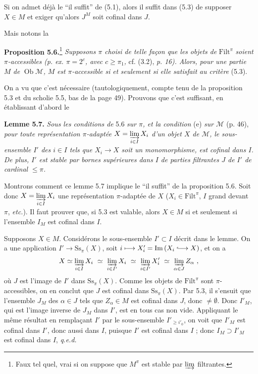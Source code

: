 \documentclass[11pt]{article}
\newcommand{\printedpage}[1]{\marginpar{\footnotesize p.~#1}}
\newcommand{\msp}[1]{\marginpar{\footnotesize [#1]}}
\newcommand{\cM}{\mathcal{M}}
\newcommand{\Filt}{\mathrm{Filt}}
\newcommand{\Ob}{\operatorname{Ob}}
\newcommand{\Ss}{\mathrm{Ss}}
\newcommand{\Img}{\mathrm{Im}\,}
\newcommand{\hookto}{\lhook\joinrel\longrightarrow}
\begin{document}
Si on admet déjà le ``il suffit'' de (5.1), alors il suffit dans (5.3) de supposer $X \in M$ et exiger qu'alors $J^{M}$ soit cofinal dans $J$.

Mais notons la
\msp{page 52}

\textbf{Proposition 5.6.}\footnote[21]{Faux tel quel, vrai si on suppose que $M^{\pi}$ est stable par $\varinjlim$ filtrantes.} \textit{Supposons $\pi$ choisi de telle façon que les objets de} $\Filt^{\pi}$ \textit{soient $\pi$-accessibles (p. ex. $\pi = 2^{c}$, avec $c \geq \pi_1$,} cf. (3.2), \textit{p. 16). Alors, pour une partie $M$ de} $\Ob\cM$\textit{, $M$ est $\pi$-accessible si et seulement si elle satisfait au critère} (5.3).

On a vu que c'est nécessaire (tautologiquement, compte tenu de la proposition 5.3 et du scholie 5.5, bas de la page 49). Prouvons que c'est suffisant, en établissant d'abord le

\textbf{Lemme 5.7.} \textit{Sous les conditions de} 5.6 \textit{sur $\pi$, et la condition} (e) \textit{sur $\cM$} (p. 46), \textit{pour toute représentation $\pi$-adaptée $X = \varinjlim\limits_{i\in I} X_i$ d'un objet $X$ de $\cM$, le sous-ensemble $I'$ des $i \in I$ tels que $X_i \longrightarrow X$ soit un monomorphisme, est cofinal dans $I$. De plus, $I'$ est stable par bornes supérieures dans $I$ de parties filtrantes $J$ de $I'$ de cardinal $\leq \pi$.}

Montrons comment ce lemme 5.7 implique le ``il suffit'' de la proposition 5.6. Soit donc $X = \varinjlim\limits_{i\in I} X_i$ une représentation $\pi$-adaptée de $X$ ($X_i \in \Filt^{\pi}$, $I$ grand devant $\pi$, \textit{etc.}). Il faut prouver que, si 5.3 est valable, alors $X \in M$ si et seulement si l'ensemble $I_M$ est cofinal dans $I$.

\msp{page 53}
Supposons $X \in M$. Considérons le sous-ensemble $I' \subset I$ décrit dans le lemme. On a une application $I' \longrightarrow \Ss_{\pi}(X)$, soit $i \longmapsto X'_i = \Img (X_i \hookto X)$, et on a
\[
X \simeq \varinjlim_{i\in I} X_i \ \simeq \ \varinjlim_{i\in I'} X_i \ \simeq \ \varinjlim_{i\in I'} X'_i \ \simeq \ \varinjlim_{\alpha\in J} Z_{\alpha} \ ,
\]
où $J$ est l'image de $I'$ dans $\Ss_{\pi}(X)$. Comme les objets de $\Filt^{\pi}$ sont $\pi$-accessibles, on en conclut que $J$ est cofinal dans $\Ss_{\pi}(X)$. Par 5.3, il s'ensuit que l'ensemble $J_M$ des $\alpha \in J$
\printedpage{33}
tels que $Z_{\alpha} \in M$ est cofinal dans $J$, donc $\neq \emptyset$. Donc $I'_M$, qui est l'image inverse de $J_M$ dans $I'$, est en tous cas non vide. Appliquant le même résultat en remplaçant $I'$ par le sous-ensemble $I'_{\geq i'_0}$, on voit que $I'_M$ est cofinal dans $I'$, donc aussi dans $I$, puisque $I'$ est cofinal dans $I$ ; donc $I_M \supset I'_M$ est cofinal dans $I$, \quad \textit{q.e.d.}
\end{document}
